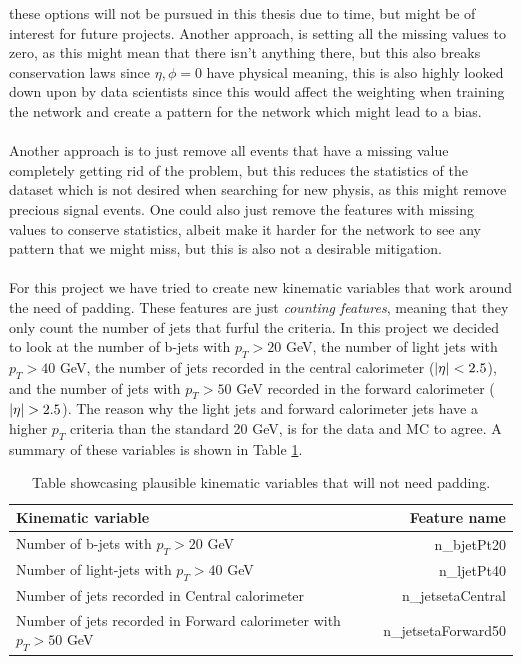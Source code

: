 \documentclass[14pt, a4paper]{book}
\begin{document}
these options will not be pursued in this thesis due to time, but might be of interest for future projects. Another approach, is setting all the missing values to zero, as this might mean that there isn't anything there, 
but this also breaks conservation laws since $\eta,\phi=0$ have physical meaning, this is also highly looked down upon by data scientists since this would affect the weighting when training the network and create a pattern for the network which might lead to a bias.\\ 
\\Another approach is to just remove all events that have a missing value completely getting rid of the problem, but this reduces the statistics of the dataset which is not desired when searching for new physis, as this might remove precious signal events.
One could also just remove the features with missing values to conserve statistics, albeit make it harder for the network to see any pattern that we might miss, but this is also not a desirable mitigation.\\
\\For this project we have tried to create new kinematic variables that work around the need of padding. These features are just \textit{counting features}, meaning that they only count the number of jets that furful the criteria. 
In this project we decided to look at the number of b-jets with $p_T > 20$ GeV, the number of light jets with $p_T>40$ GeV, the number of jets recorded in the central calorimeter ($\abs{\eta} < 2.5$), and the number of 
jets with $p_T>50$ GeV recorded in the forward calorimeter ($\abs{\eta} > 2.5$). The reason why the light jets and forward calorimeter jets have a higher $p_T$ criteria than the standard 20 GeV, is for the data and MC to agree. 
A summary of these variables is shown in Table \ref{tab:padding_variables}.\\
\begin{table}[!h]
   \centering
   \begin{tabular}{l|r}\midrule\midrule
      Kinematic variable                                                      & Feature name          \\\midrule
      Number of b-jets with $p_T > 20$ GeV                                    & n\_bjetPt20\\
      Number of light-jets with $p_T > 40$ GeV                                & n\_ljetPt40\\
      Number of jets recorded in Central calorimeter                          &n\_jetsetaCentral\\
      Number of jets recorded in Forward calorimeter with $p_T > 50$ GeV      & n\_jetsetaForward50\\\midrule\midrule
   \end{tabular}
   \caption[New kinematic variables that need no padding]{Table showcasing plausible kinematic variables that will not need padding.}
   \label{tab:padding_variables}
\end{table}
\end{document}
